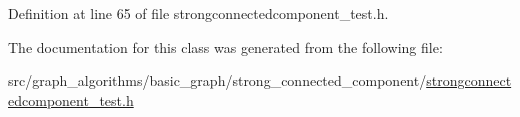 Definition at line 65 of file strongconnectedcomponent\+\_\+test.\+h.



The documentation for this class was generated from the following file\+:\begin{DoxyCompactItemize}
\item 
src/graph\+\_\+algorithms/basic\+\_\+graph/strong\+\_\+connected\+\_\+component/\hyperlink{strongconnectedcomponent__test_8h}{strongconnectedcomponent\+\_\+test.\+h}\end{DoxyCompactItemize}
